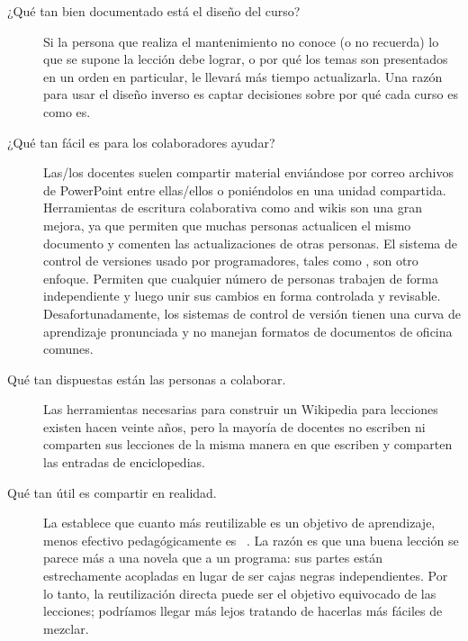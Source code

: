 \begin{description}
 
\item[¿Qué tan bien documentado está el diseño del curso?]
  Si la persona que realiza el mantenimiento no conoce (o no recuerda)
  lo que se supone la lección debe lograr,
  o por qué los temas son presentados en un orden en particular,
  le llevará más tiempo actualizarla.
  Una razón para usar el diseño inverso
  es captar decisiones sobre por qué cada curso es como es.
 
\item[¿Qué tan fácil es para los colaboradores ayudar?]
  Las/los docentes suelen compartir material enviándose por correo archivos de PowerPoint entre ellas/ellos o poniéndolos en una unidad compartida.
  Herramientas de escritura colaborativa como  and wikis
  son una gran mejora,
  ya que permiten que muchas personas actualicen el mismo documento
  y comenten las actualizaciones de otras personas.
  El sistema de control de versiones usado por programadores,
  tales como ,
  son otro enfoque.
  Permiten que cualquier número de personas trabajen de forma independiente
  y luego unir sus cambios en forma controlada y revisable.
  Desafortunadamente,
  los sistemas de control de versión tienen una curva de aprendizaje pronunciada
   y no manejan formatos de documentos de oficina comunes.
 
\item[Qué tan dispuestas están las personas a colaborar.]
  Las herramientas necesarias para construir un Wikipedia para lecciones
  existen hacen veinte años,
  pero la mayoría de docentes no escriben ni comparten sus lecciones
  de la misma manera en que escriben y comparten las entradas de enciclopedias.
 
\item[Qué tan útil es compartir en realidad.]
  La  establece que
  cuanto más reutilizable es un objetivo de aprendizaje,
  menos efectivo pedagógicamente es ~\cite{Wile2002}.
  La razón es que una buena lección se parece más a una novela que a un programa:
  sus partes están estrechamente acopladas en lugar de ser cajas negras independientes.
  Por lo tanto, la reutilización directa puede ser el objetivo equivocado de las lecciones;
  podríamos llegar más lejos tratando de hacerlas más fáciles de mezclar.
 \end{description}


